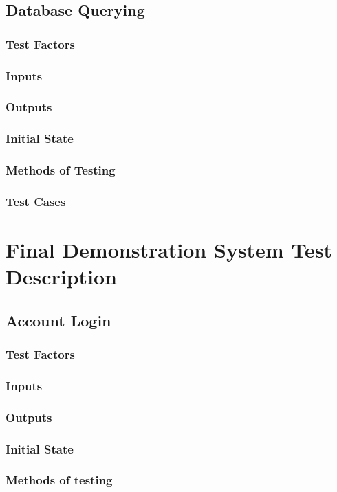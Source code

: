 \documentclass[12pt]{article}
\begin{document}
\subsection{Database Querying}

\subsubsection{Test Factors}
\subsubsection{Inputs}
\subsubsection{Outputs}
\subsubsection{Initial State}
\subsubsection{Methods of Testing}
\subsubsection{Test Cases}

\section{Final Demonstration System Test Description}

\subsection{Account Login}
\subsubsection{Test Factors}
\subsubsection{Inputs}
\subsubsection{Outputs}
\subsubsection{Initial State}
\subsubsection{Methods of testing}
\end{document}

